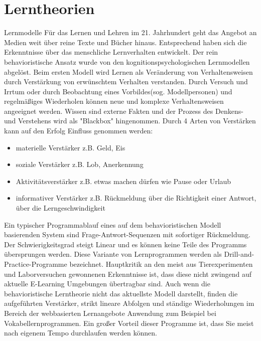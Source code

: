 \documentclass[a4paper, 12pt, twoside, BCOR=20mm, DIV=calc, abstracton, parskip=half*, toc=bibliography, toc=listof, headsepline, footsepline, headings=small, numbers=enddot]{scrreprt}
\begin{document}
	\section{Lerntheorien}
	{Lernmodelle}\newline
	Für das Lernen und Lehren im 21. Jahrhundert geht das Angebot an Medien weit über reine Texte und Bücher hinaus. Entsprechend haben sich die Erkenntnisse über das menschliche Lernverhalten entwickelt. Der rein behavioristische Ansatz \cite[John Watson/ B.F.Skinner]{baumgart1998entwicklungs} wurde von den kognitionspsychologischen Lernmodellen \cite[S.102]{arnold2013handbuch}abgelöst. Beim ersten Modell wird Lernen als Veränderung von Verhaltensweisen durch Verstärkung von erwünschtem Verhalten verstanden. Durch Versuch und Irrtum oder durch Beobachtung eines Vorbildes(sog. Modellpersonen) und regelmäßiges Wiederholen können neue und komplexe Verhaltensweisen angeeignet werden\cite[S.101 Skinner]{arnold2013handbuch}. Wissen sind externe Fakten und der Prozess des Denkens- und Verstehens wird als "Blackbox" hingenommen. 
	Durch 4 Arten von Verstärken kann auf den Erfolg Einfluss genommen werden: 
	\begin{itemize}
		\item materielle Verstärker z.B. Geld, Eis
		\item soziale Verstärker z.B. Lob, Anerkennung
		\item Aktivitätsverstärker z.B. etwas machen dürfen wie Pause oder Urlaub
		\item informativer Verstärker z.B. Rückmeldung über die Richtigkeit einer Antwort, über die Lerngeschwindigkeit
	\end{itemize}\cite[S.21]{issing2009online}
	Ein typischer Programmablauf eines auf dem behavioristischen Modell basierenden System sind Frage-Antwort-Sequenzen mit sofortiger Rückmeldung. Der Schwierigkeitsgrad steigt Linear und es können keine Teile des Programms übersprungen werden. Diese Variante von Lernprogrammen werden als Drill-and-Practice-Programme bezeichnet. Hauptkritik an den meist aus Tierexperimenten und Laborversuchen gewonnenen Erkenntnisse ist, dass diese nicht zwingend auf aktuelle E-Learning Umgebungen übertragbar sind.
	Auch wenn die behavioristische Lerntheorie nicht das aktuellste Modell darstellt, finden die aufgeführten Verstärker, strikt lineare Abfolgen und ständige Wiederholungen im Bereich der webbasierten Lernangebote Anwendung zum Beispiel bei Vokabellernprogrammen. Ein großer Vorteil dieser Programme ist, dass Sie meist nach eigenem Tempo durchlaufen werden können\cite[65 ff.]{niegemann2005}. 
	
\end{document}
